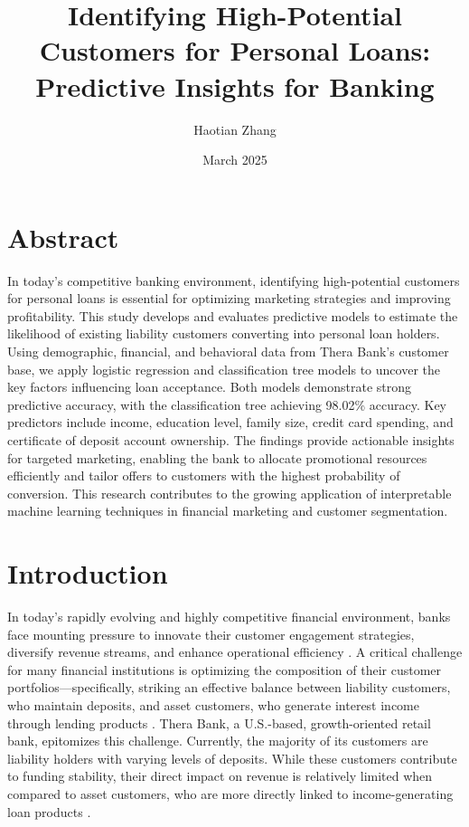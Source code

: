 \documentclass[12pt]{article}
\title{Identifying High-Potential Customers for Personal Loans: Predictive Insights for Banking}
\author{Haotian Zhang}
\date{March 2025}
\begin{document}
\doublespacing
\maketitle


\section{Abstract}
In today’s competitive banking environment, identifying high-potential customers for personal loans is essential for optimizing marketing strategies and improving profitability. This study develops and evaluates predictive models to estimate the likelihood of existing liability customers converting into personal loan holders. Using demographic, financial, and behavioral data from Thera Bank’s customer base, we apply logistic regression and classification tree models to uncover the key factors influencing loan acceptance. Both models demonstrate strong predictive accuracy, with the classification tree achieving 98.02\% accuracy. Key predictors include income, education level, family size, credit card spending, and certificate of deposit account ownership. The findings provide actionable insights for targeted marketing, enabling the bank to allocate promotional resources efficiently and tailor offers to customers with the highest probability of conversion. This research contributes to the growing application of interpretable machine learning techniques in financial marketing and customer segmentation.
\section{Introduction}
In today’s rapidly evolving and highly competitive financial environment, banks face mounting pressure to innovate their customer engagement strategies, diversify revenue streams, and enhance operational efficiency \citep{Krasnikov2009TheIndustry}. A critical challenge for many financial institutions is optimizing the composition of their customer portfolios—specifically, striking an effective balance between liability customers, who maintain deposits, and asset customers, who generate interest income through lending products \citep{Nikiel2002CUSTOMERBANKING}. Thera Bank, a U.S.-based, growth-oriented retail bank, epitomizes this challenge. Currently, the majority of its customers are liability holders with varying levels of deposits. While these customers contribute to funding stability, their direct impact on revenue is relatively limited when compared to asset customers, who are more directly linked to income-generating loan products \citep{Machauer2001SegmentationAttitudes}.
\end{document}
